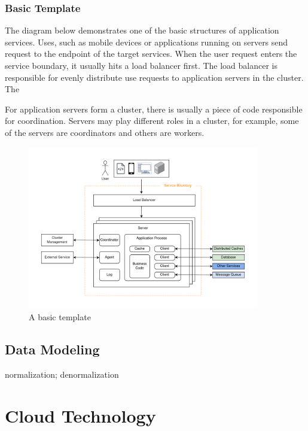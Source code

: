 \documentclass[letterpaper, oneside]{book}
\theoremstyle{definition}
\theoremstyle{remark}
\begin{document}
\section{Basic Template}

The diagram below demonstrates one of the basic structures of application services. Uses, such as mobile devices or applications running on servers send request to the endpoint of the target services. When the user request enters the service boundary, it usually hits a load balancer first. The load balancer is responsible for evenly distribute use requests to application servers in the cluster. The

For application servers form a cluster, there is usually a piece of code responsible for coordination. Servers may play different roles in a cluster, for example, some of the servers are coordinators and others are workers.



\begin{figure}[h]
    \centering
    \includegraphics[width=0.90\textwidth]{system_design_basic_template.png}
    \caption{A basic template}
    \label{fig:basic_template}
\end{figure}


\chapter{Data Modeling}
normalization; denormalization


\part{Cloud Technology}
\end{document}
